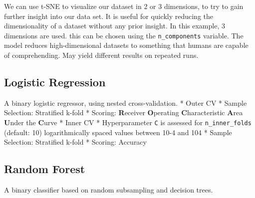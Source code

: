 \documentclass[11pt]{article}
\begin{document}
We can use t-SNE to visualize our dataset in 2 or 3 dimensions, to try
to gain further insight into our data set. It is useful for quickly
reducing the dimensionality of a dataset without any prior insight. In
this example, 3 dimensions are used. this can be chosen using the
\texttt{n\_components} variable. The model reduces high-dimensional
datasets to something that humans are capable of comprehending. May
yield different results on repeated runs.

\subsection{Logistic Regression}\label{logistic-regression}

A binary logistic regressor, using nested cross-validation. * Outer CV *
Sample Selection: Stratified k-fold * Scoring: \textbf{R}eceiver
\textbf{O}perating \textbf{C}haracteristic \textbf{A}rea \textbf{U}nder
the \textbf{C}urve * Inner CV * Hyperparameter \texttt{C} is assessed
for \texttt{n\_inner\_folds} (default: 10) logarithmically spaced values
between 10-4 and 104 * Sample Selection: Stratified k-fold * Scoring:
Accuracy

\subsection{Random Forest}\label{random-forest}

A binary classifier based on random subsampling and decision trees.
\end{document}
